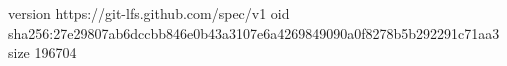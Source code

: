 version https://git-lfs.github.com/spec/v1
oid sha256:27e29807ab6dccbb846e0b43a3107e6a4269849090a0f8278b5b292291c71aa3
size 196704
